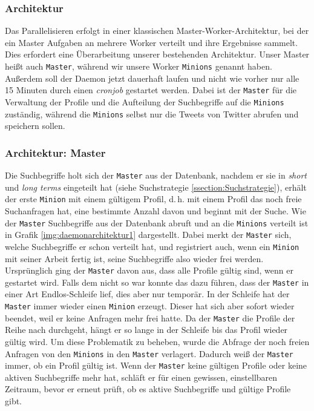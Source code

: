 \subsubsection{Architektur} %
Das Parallelisieren erfolgt in einer klassischen Master-Worker-Architektur, bei der ein Master Aufgaben an mehrere Worker verteilt und ihre Ergebnisse sammelt.
Dies erfordert eine Überarbeitung unserer bestehenden Architektur.
Unser Master heißt auch \texttt{Master}, während wir unsere Worker \texttt{Minions} genannt haben.
Außerdem soll der Daemon jetzt dauerhaft laufen und nicht wie vorher nur alle 15 Minuten durch einen \textit{cronjob} gestartet werden.
Dabei ist der \texttt{Master} für die Verwaltung der Profile und die Aufteilung der Suchbegriffe auf die \texttt{Minions} zuständig, während die \texttt{Minions} selbst nur die Tweets von Twitter abrufen und speichern sollen.

\subsubsection{Architektur: Master}%
Die Suchbegriffe holt sich der \texttt{Master} aus der Datenbank, nachdem er sie in \textit{short} und \textit{long terms} eingeteilt hat (siehe Suchstrategie \ref{ssection:Suchstrategie}), erhält der erste \texttt{Minion} mit einem gültigem Profil, d.\,h. mit einem Profil das noch freie Suchanfragen hat, eine bestimmte Anzahl davon und beginnt mit der Suche.
Wie der \texttt{Master} Suchbegriffe aus der Datenbank abruft und an die \texttt{Minions} verteilt ist in Grafik \ref{img:daemonarchitektur1} dargestellt.
Dabei merkt der \texttt{Master} sich, welche Suchbegriffe er schon verteilt hat, und registriert auch, wenn ein \texttt{Minion} mit seiner Arbeit fertig ist, seine Suchbegriffe also wieder frei werden.
Ursprünglich ging der \texttt{Master} davon aus, dass alle Profile gültig sind, wenn er gestartet wird. Falls dem nicht so war konnte das dazu führen, dass der \texttt{Master} in einer Art Endlos-Schleife lief, dies aber nur temporär.
In der Schleife hat der \texttt{Master} immer wieder einen \texttt{Minion} erzeugt. Dieser hat sich aber sofort wieder beendet, weil er keine Anfragen mehr frei hatte.
Da der \texttt{Master} die Profile der Reihe nach durchgeht, hängt er so lange in der Schleife bis das Profil wieder gültig wird.
Um diese Problematik zu beheben, wurde die Abfrage der noch freien Anfragen von den \texttt{Minions} in den \texttt{Master} verlagert.
Dadurch weiß der \texttt{Master} immer, ob ein Profil gültig ist.
Wenn der \texttt{Master} keine gültigen Profile oder keine aktiven Suchbegriffe mehr hat, schläft er für einen gewissen, einstellbaren Zeitraum, bevor er erneut prüft, ob es aktive Suchbegriffe und gültige Profile gibt.

